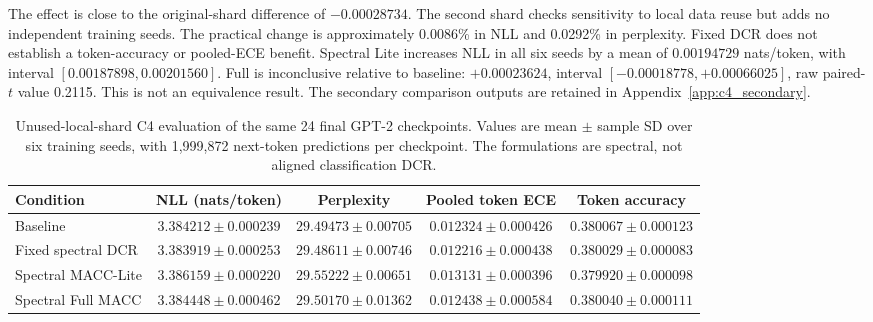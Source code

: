 \documentclass[a4paper,fleqn]{cas-dc}
\let\CAENLcaption\caption
\let\caption\CAENLcaption
\begin{document}
The effect is close to the original-shard difference of $-0.00028734$.
The second shard checks sensitivity to local data reuse but adds no
independent training seeds. The practical change is approximately
0.0086\% in NLL and 0.0292\% in perplexity. Fixed DCR does not establish a
token-accuracy or pooled-ECE benefit. Spectral Lite increases NLL in all
six seeds by a mean of $0.00194729$ nats/token, with interval
$[0.00187898,0.00201560]$. Full is inconclusive relative to baseline:
$+0.00023624$, interval $[-0.00018778,+0.00066025]$, raw paired-$t$ value
0.2115. This is not an equivalence result. The secondary comparison
outputs are retained in Appendix~\ref{app:c4_secondary}.


\begin{table}[pos=tbp]
\caption{Unused-local-shard C4 evaluation of the same 24 final
GPT-2 checkpoints. Values are mean $\pm$ sample SD over six
training seeds, with 1,999,872 next-token predictions per checkpoint.
The formulations are spectral, not aligned classification DCR.}
\label{tab:c4_holdout}
\centering\small
\begin{tabularx}{\textwidth}{@{}Ycccc@{}}
\toprule
Condition & NLL (nats/token) & Perplexity &
Pooled token ECE & Token accuracy \\
\midrule
Baseline &
$3.384212\pm0.000239$ & $29.49473\pm0.00705$ &
$0.012324\pm0.000426$ & $0.380067\pm0.000123$ \\
Fixed spectral DCR &
$3.383919\pm0.000253$ & $29.48611\pm0.00746$ &
$0.012216\pm0.000438$ & $0.380029\pm0.000083$ \\
Spectral MACC-Lite &
$3.386159\pm0.000220$ & $29.55222\pm0.00651$ &
$0.013131\pm0.000396$ & $0.379920\pm0.000098$ \\
Spectral Full MACC &
$3.384448\pm0.000462$ & $29.50170\pm0.01362$ &
$0.012438\pm0.000584$ & $0.380040\pm0.000111$ \\
\bottomrule
\end{tabularx}
\end{table}
\end{document}
